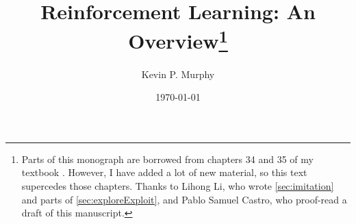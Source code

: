 \documentclass{book}
\begin{document}
\title{Reinforcement Learning: An Overview\footnote{
  Parts of this monograph
  are borrowed from chapters 34 and 35 of my textbook \citep{book2}.
  However, I have  added a lot of new material,
  so this text supercedes those chapters.
  Thanks to Lihong Li,
  who wrote 
  \cref{sec:imitation}
  and parts of \cref{sec:exploreExploit},
  and Pablo Samuel Castro,
  who  proof-read a draft of this manuscript.
}
}
\author{Kevin P. Murphy}
\date{\today}
\maketitle

\tableofcontents




%
%
%
%
%
%


% 

% 
% 
% 
% 


\printbibliography 
\end{document}
